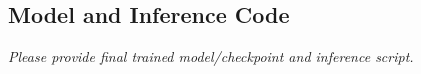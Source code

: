 \documentclass[letterpaper,10pt,conference]{ieeeconf}
\newcommand{\instruction}[1]{\textcolor{instructionblue}{\textit{#1}}}
\begin{document}


\subsection{Model and Inference Code}

\instruction{Please provide final trained model/checkpoint and inference script.}






\end{document}
